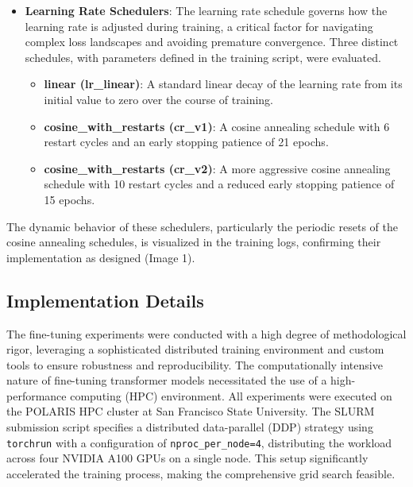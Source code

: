 \begin{itemize}
    \item \textbf{Learning Rate Schedulers}: The learning rate schedule governs how the learning rate is adjusted during training, a critical factor for navigating complex loss landscapes and avoiding premature convergence. Three distinct schedules, with parameters defined in the training script, were evaluated.
    \begin{itemize}
        \item \textbf{linear (lr\_linear)}: A standard linear decay of the learning rate from its initial value to zero over the course of training.
        \item \textbf{cosine\_with\_restarts (cr\_v1)}: A cosine annealing schedule with 6 restart cycles and an early stopping patience of 21 epochs.
        \item \textbf{cosine\_with\_restarts (cr\_v2)}: A more aggressive cosine annealing schedule with 10 restart cycles and a reduced early stopping patience of 15 epochs.
    \end{itemize}
\end{itemize}
The dynamic behavior of these schedulers, particularly the periodic resets of the cosine annealing schedules, is visualized in the training logs, confirming their implementation as designed (Image 1).

\subsection{Implementation Details}
The fine-tuning experiments were conducted with a high degree of methodological rigor, leveraging a sophisticated distributed training environment and custom tools to ensure robustness and reproducibility. The computationally intensive nature of fine-tuning transformer models necessitated the use of a high-performance computing (HPC) environment. All experiments were executed on the POLARIS HPC cluster at San Francisco State University. The SLURM submission script specifies a distributed data-parallel (DDP) strategy using \verb|torchrun| with a configuration of \verb|nproc_per_node=4|, distributing the workload across four NVIDIA A100 GPUs on a single node. This setup significantly accelerated the training process, making the comprehensive grid search feasible.

